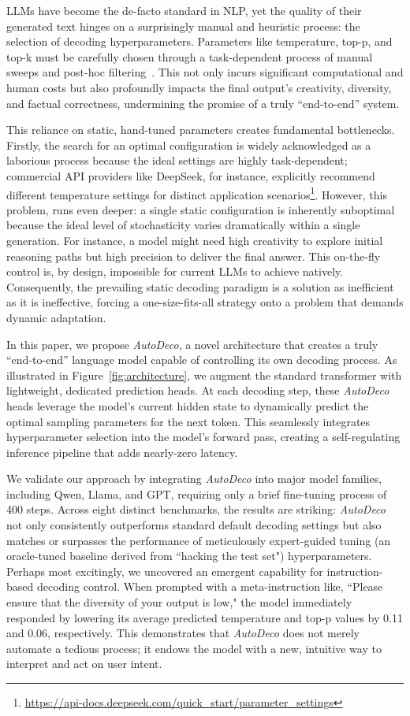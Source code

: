 LLMs have become the de-facto standard in NLP, yet the quality of their generated text hinges on a surprisingly manual and heuristic process: the selection of decoding hyperparameters. Parameters like temperature, top-p, and top-k must be carefully chosen through a task-dependent process of manual sweeps and post-hoc filtering~\citep{shi2024thorough}. This not only incurs significant computational and human costs but also profoundly impacts the final output's creativity, diversity, and factual correctness, undermining the promise of a truly ``end-to-end'' system.

This reliance on static, hand-tuned parameters creates fundamental bottlenecks. Firstly, the search for an optimal configuration is widely acknowledged as a laborious process because the ideal settings are highly task-dependent; commercial API providers like DeepSeek, for instance, explicitly recommend different temperature settings for distinct application scenarios\footnote{\url{https://api-docs.deepseek.com/quick_start/parameter_settings}}. However, this problem, runs even deeper: a single static configuration is inherently suboptimal because the ideal level of stochasticity varies dramatically within a single generation. For instance, a model might need high creativity to explore initial reasoning paths but high precision to deliver the final answer. This on-the-fly control is, by design, impossible for current LLMs to achieve natively. Consequently, the prevailing static decoding paradigm is a solution as inefficient as it is ineffective, forcing a one-size-fits-all strategy onto a problem that demands dynamic adaptation.

In this paper, we propose \textit{AutoDeco}, a novel architecture that creates a truly ``end-to-end'' language model capable of controlling its own decoding process. As illustrated in Figure~\ref{fig:architecture}, we augment the standard transformer with lightweight, dedicated prediction heads. At each decoding step, these \textit{AutoDeco} heads leverage the model's current hidden state to dynamically predict the optimal sampling parameters for the next token. This seamlessly integrates hyperparameter selection into the model's forward pass, creating a self-regulating inference pipeline that adds nearly-zero latency.

We validate our approach by integrating \textit{AutoDeco} into major model families, including Qwen, Llama, and GPT, requiring only a brief fine-tuning process of 400 steps. Across eight distinct benchmarks, the results are striking: \textit{AutoDeco} not only consistently outperforms standard default decoding settings but also matches or surpasses the performance of meticulously expert-guided tuning (an oracle-tuned baseline derived from ``hacking the test set") hyperparameters. Perhaps most excitingly, we uncovered an emergent capability for instruction-based decoding control. When prompted with a meta-instruction like, ``Please ensure that the diversity of your output is low," the model immediately responded by lowering its average predicted temperature and top-p values by 0.11 and 0.06, respectively. This demonstrates that \textit{AutoDeco} does not merely automate a tedious process; it endows the model with a new, intuitive way to interpret and act on user intent.


